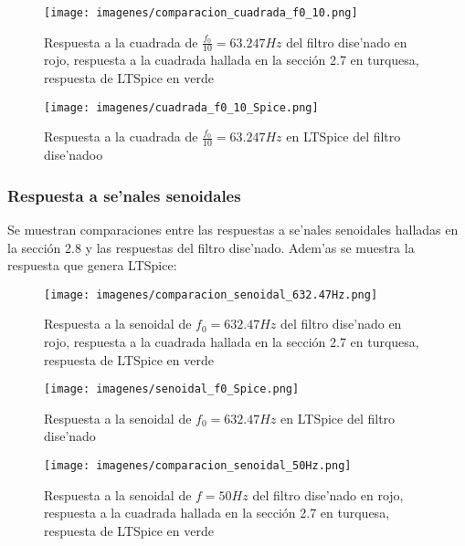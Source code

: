 \documentclass[12pt, titlepage]{article}
\begin{document}
    \newpage
    
    \begin{figure}[!htb]
    \texttt{[image: imagenes/comparacion\_cuadrada\_f0\_10.png]}
    \centering
    \caption{Respuesta a la cuadrada de $\frac{f_0}{10} = 63.247Hz$  del filtro dise'nado en rojo, respuesta a la cuadrada hallada en la sección 2.7 en turquesa, respuesta de LTSpice en verde}
    \end{figure}
    
    \begin{figure}[!htb]
    \texttt{[image: imagenes/cuadrada\_f0\_10\_Spice.png]}
    \centering
    \caption{Respuesta a la cuadrada de $\frac{f_0}{10} = 63.247Hz$ en LTSpice del filtro dise'nadoo}
    \end{figure}
    
    \newpage
    
    \subsubsection{Respuesta a se'nales senoidales}
    Se muestran comparaciones entre las respuestas a se'nales senoidales halladas en la sección 2.8 y las respuestas del filtro dise'nado. Adem'as se muestra la respuesta que genera LTSpice:
    
    \begin{figure}[!htb]
    \texttt{[image: imagenes/comparacion\_senoidal\_632.47Hz.png]}
    \centering
    \caption{Respuesta a la senoidal de $f_0 = 632.47Hz$ del filtro dise'nado en rojo, respuesta a la cuadrada hallada en la sección 2.7 en turquesa, respuesta de LTSpice en verde}
    \end{figure}
    
    \begin{figure}[!htb]
    \texttt{[image: imagenes/senoidal\_f0\_Spice.png]}
    \centering
    \caption{Respuesta a la senoidal de $f_0 = 632.47Hz$ en LTSpice del filtro dise'nado}
    \end{figure}
    
    \newpage
    
    \begin{figure}[!htb]
    \texttt{[image: imagenes/comparacion\_senoidal\_50Hz.png]}
    \centering
    \caption{Respuesta a la senoidal de $f = 50Hz$ del filtro dise'nado en rojo, respuesta a la cuadrada hallada en la sección 2.7 en turquesa, respuesta de LTSpice en verde}
    \end{figure}
    
\end{document}
